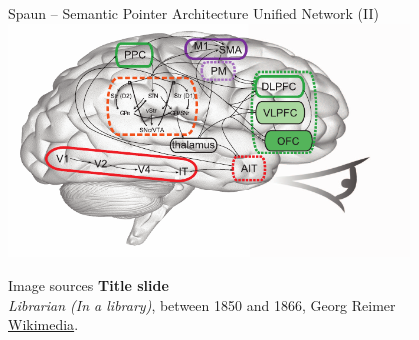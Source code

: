 \documentclass[handout,aspectratio=169]{beamer}
\begin{document}
	\begin{frame}{Spaun -- Semantic Pointer Architecture Unified Network (II)}
		\centering
		\includegraphics[width=0.8\textwidth]{media/eliasmith_2012_spaun_anatomy.pdf}
	\end{frame}


	\backupbegin

	\begin{frame}[noframenumbering]{Image sources}
		\small
		\textbf{Title slide}\\\emph{Librarian (In a library)}, between 1850 and 1866,  Georg Reimer\\ \href{https://commons.wikimedia.org/wiki/File:Reimer_Librarian.jpg}{Wikimedia}.
	\end{frame}

	\backupend
	
\end{document}
